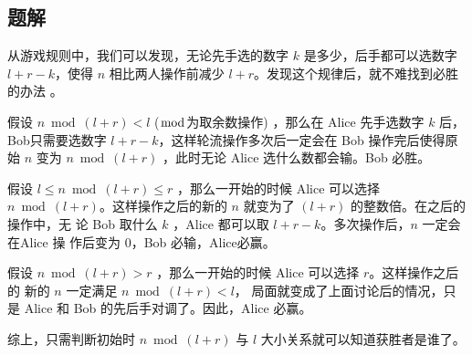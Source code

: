 \subsection{题解}
\begin{frame} %
从游戏规则中，我们可以发现，无论先手选的数字 $k$ 是多少，后手都可以选数字 $l + r
- k$，使得 $n$ 相比两人操作前减少 $l + r$。发现这个规律后，就不难找到必胜的办法
。

假设 $n \bmod (l + r) < l$  ($\bmod$为取余数操作) ，那么在 Alice 先手选数字 $k$
后，Bob只需要选数字 $l + r - k$，这样轮流操作多次后一定会在 Bob 操作完后使得原始
$n$ 变为 $n \bmod (l + r)$ ，此时无论 Alice 选什么数都会输。Bob 必胜。
\end{frame}


\begin{frame}
假设 $l \leq n \bmod (l + r) \leq r$ ，那么一开始的时候 Alice 可以选择 $n \bmod
(l + r)$。这样操作之后的新的 $n$ 就变为了 $(l + r)$ 的整数倍。在之后的操作中，无
论 Bob 取什么 $k$ ，Alice 都可以取 $l + r - k$。多次操作后，$n$ 一定会在Alice 操
作后变为 $0$，Bob 必输，Alice必赢。

假设 $n \bmod (l + r) > r$ ，那么一开始的时候 Alice 可以选择 $r$。这样操作之后的
新的 $n$ 一定满足 $n \bmod (l + r) < l$， 局面就变成了上面讨论后的情况，只是
Alice 和 Bob 的先后手对调了。因此，Alice 必赢。

综上，只需判断初始时 $n \bmod (l + r)$ 与 $l$ 大小关系就可以知道获胜者是谁了。
\end{frame}

